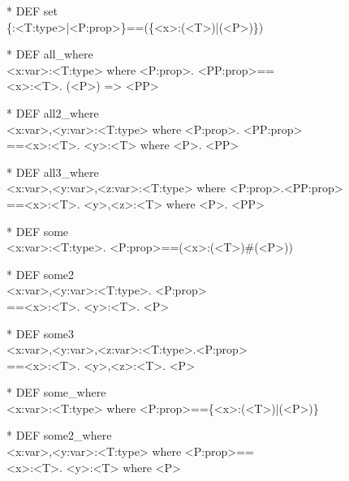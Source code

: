 \begin{prl*}
\>* DEF set\\
\>  \{<x:var>:<T:type>|<P:prop>\}==(\{<x>:(<T>)|(<P>)\})
\end{prl*}

\begin{prl*}
\>* DEF all\_where\\
\>  \mforall{}<x:var>:<T:type> where <P:prop>. <PP:prop>==\\
\>  \mforall{}<x>:<T>. \mdownarrow{}(<P>) => <PP>
\end{prl*}

\begin{prl*}
\>* DEF all2\_where\\
\>  \mforall{}<x:var>,<y:var>:<T:type> where <P:prop>. <PP:prop>\\
\>  ==\mforall{}<x>:<T>. \mforall{}<y>:<T> where <P>. <PP>
\end{prl*}

\begin{prl*}
\>* DEF all3\_where\\
\>  \mforall{}<x:var>,<y:var>,<z:var>:<T:type> where <P:prop>.<PP:prop>\\
\>  ==\mforall{}<x>:<T>. \mforall{}<y>,<z>:<T> where <P>. <PP>
\end{prl*}

\begin{prl*}
\>* DEF some\\
\>  \mexists{}<x:var>:<T:type>. <P:prop>==(<x>:(<T>)\#(<P>))
\end{prl*}

\begin{prl*}
\>* DEF some2\\
\>  \mexists{}<x:var>,<y:var>:<T:type>. <P:prop>\\
\>  ==\mexists{}<x>:<T>. \mexists{}<y>:<T>. <P>
\end{prl*}

\begin{prl*}
\>* DEF some3\\
\>  \mexists{}<x:var>,<y:var>,<z:var>:<T:type>.<P:prop>\\
\>  ==\mexists{}<x>:<T>. \mexists{}<y>,<z>:<T>. <P>
\end{prl*}

\begin{prl*}
\>* DEF some\_where\\
\>  \mexists{}<x:var>:<T:type> where <P:prop>==\{<x>:(<T>)|(<P>)\}
\end{prl*}

\begin{prl*}
\>* DEF some2\_where\\
\>  \mexists{}<x:var>,<y:var>:<T:type> where <P:prop>==\\
\>  \mexists{}<x>:<T>. \mexists{}<y>:<T> where <P>
\end{prl*}

